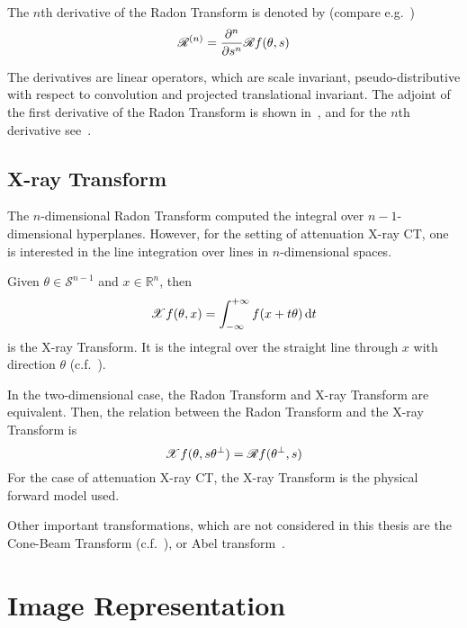 \begin{definition}
	The \(n\)th derivative of the Radon Transform is denoted by (compare
	e.g.\ \cite{nilchian_differential_2012,nilchian_fast_2013})
	\[ \mathscr{R}^{(n)} = \frac{\partial^n}{\partial s^n} \mathscr{R} f(\theta, s)\]
\end{definition}

The derivatives are linear operators, which are scale invariant, pseudo-distributive with respect to
convolution and projected translational invariant. The adjoint of the first derivative of the Radon
Transform is shown in~\cite{nilchian_differential_2012}, and for the \(n\)th derivative
see~\cite{nilchian_fast_2013}.

\section{X-ray Transform}\label{sec:xray_transform}

The \(n\)-dimensional Radon Transform computed the integral over \(n-1\)-dimensional hyperplanes.
However, for the setting of attenuation X-ray CT, one is interested in the line integration over
lines in \(n\)-dimensional spaces.

\begin{definition}
	Given \(\theta \in \mathscr{S}^{n-1}\) and \(x \in \mathbb{R}^n\), then
	\[ \mathscr{X} f(\theta, x) = \int_{-\infty}^{+\infty} f(x + t \theta) \, \mathrm{d}t\]
	is the X-ray Transform. It is the integral over the straight line through \(x\) with
	direction \(\theta\) (c.f.~\cite{natterer_mathematics_1986,solmon_x-ray_1976}).
\end{definition}

In the two-dimensional case, the Radon Transform and X-ray Transform are equivalent.
Then, the relation between the Radon Transform and the X-ray Transform is
\[\mathscr{X} f(\theta, s\theta^\perp) = \mathscr{R} f(\theta^\perp, s)\]
For the case of attenuation X-ray CT, the X-ray Transform is the physical forward model used.


Other important transformations, which are not considered in this thesis are the Cone-Beam Transform
(c.f.~\cite[Chapter~2]{carpio_inverse_2008}), or Abel transform~\cite[Chapter~4.16]{buzug_computed_2008}.

\chapter{Image Representation}\label{chap:image_representation}

